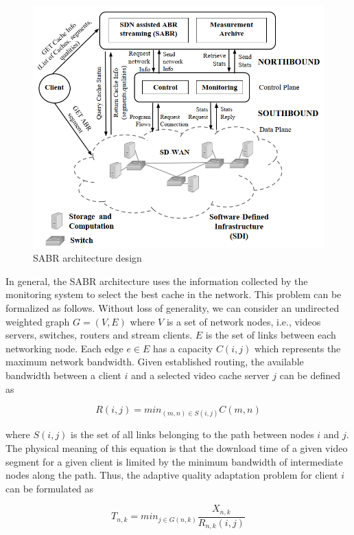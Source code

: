 \documentclass[12pt]{article}
\begin{document}
\begin{figure}[H]
\centering
\includegraphics[scale=0.5]{images/sabr-arch.png}
\caption{SABR architecture design}
\label{fig:sabr}
\end{figure}

In general, the SABR architecture uses the information collected by the monitoring system to select the best cache in the network. This problem can be formalized as follows. Without loss of generality, we can consider an undirected weighted graph $G=(V, E)$ where $V$ is a set of network nodes, i.e., videos servers, switches, routers and stream clients. $E$ is the set of links between each networking node. Each edge $e \in E$ has a capacity $C(i,j)$ which represents the maximum network bandwidth. Given established routing, the available bandwidth between a client $i$ and a selected video cache server $j$ can be defined as

\begin{equation}
    R(i, j) = min_{(m,n) \in S(i,j)} C(m,n)
\end{equation}

where $S(i,j)$ is the set of all links belonging to the path between nodes $i$ and $j$. The physical meaning of this equation is that the download time of a given video segment for a given client is limited by the minimum bandwidth of intermediate nodes along the path. Thus, the adaptive quality adaptation problem for client $i$ can be formulated as

\begin{equation}
    T_{n,k} = min_{j \in G(n,k)} \frac{X_{n,k}}{R_{n,k}(i,j)}
\end{equation}
\end{document}
